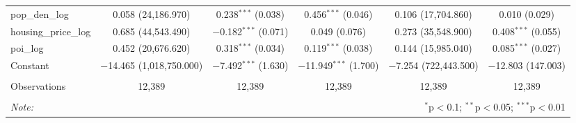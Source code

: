 \begin{table}[!htbp]
\begin{tabular}{@{\extracolsep{1pt}}lccccc}
  pop\_den\_log & 0.058 (24,186.970) & 0.238$^{***}$ (0.038) & 0.456$^{***}$ (0.046) & 0.106 (17,704.860) & 0.010 (0.029) \\ 
  housing\_price\_log & 0.685 (44,543.490) & $-$0.182$^{***}$ (0.071) & 0.049 (0.076) & 0.273 (35,548.900) & 0.408$^{***}$ (0.055) \\ 
  poi\_log & 0.452 (20,676.620) & 0.318$^{***}$ (0.034) & 0.119$^{***}$ (0.038) & 0.144 (15,985.040) & 0.085$^{***}$ (0.027) \\ 
  Constant & $-$14.465 (1,018,750.000) & $-$7.492$^{***}$ (1.630) & $-$11.949$^{***}$ (1.700) & $-$7.254 (722,443.500) & $-$12.803 (147.003) \\ 
 \hline \\[-1.8ex] 
Observations & 12,389 & 12,389 & 12,389 & 12,389 & 12,389 \\ 
\hline 
\hline \\[-1.8ex] 
\textit{Note:}  & \multicolumn{5}{r}{$^{*}$p$<$0.1; $^{**}$p$<$0.05; $^{***}$p$<$0.01} \\ 
\end{tabular} 
\end{table} 
